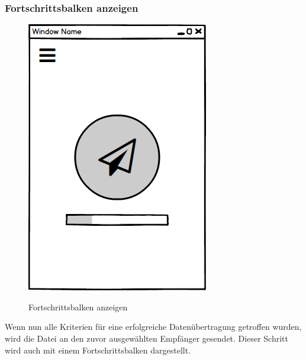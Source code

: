 \subsubsection{Fortschrittsbalken anzeigen}
\begin{figure}[H]
	\centering
	\includegraphics[width=.7\linewidth]{pictures/Desktop/Progress.png}\
	\caption{Fortschrittsbalken anzeigen}
\end{figure}
Wenn nun alle Kriterien für eine erfolgreiche Datenübertragung getroffen wurden, wird die Datei an den zuvor ausgewählten Empfänger gesendet. Dieser Schritt wird auch mit einem Fortschrittsbalken dargestellt.
